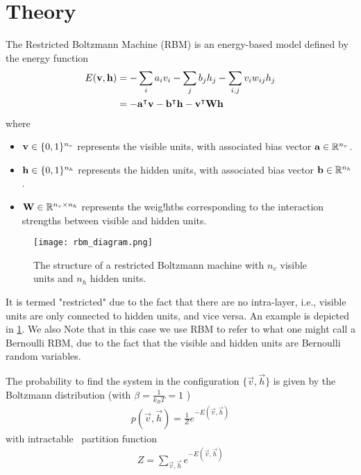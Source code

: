 \section{Theory}
The Restricted Boltzmann Machine (RBM) is an energy-based model defined by the energy function~\cite{goodfellow_deep_learning}
\begin{align}
    E(\mathbf{v}, \mathbf{h})
        &= -\sum_i a_i v_i - \sum_j b_j h_j - \sum_{i,j} v_i w_{ij} h_j \label{eq:rbm_energy} \\
        &= -\mathbf{a}^\intercal\mathbf{v} - \mathbf{b}^\intercal\mathbf{h} - \mathbf{v}^\intercal\mathbf{W}\mathbf{h} \label{eq:rbm_energy_vectorized}
\end{align}
where
\begin{itemize}
    \item \( \mathbf{v} \in \{0,1\}^{n_v} \) represents the visible units, with associated bias vector \( \mathbf{a} \in \mathbb{R}^{n_v} \).
    \item \( \mathbf{h} \in \{0,1\}^{n_h} \) represents the hidden units, with associated bias vector \( \mathbf{b} \in \mathbb{R}^{n_h} \).
    \item \( \mathbf{W} \in \mathbb{R}^{n_v \times n_h} \) represents the weig!htbs corresponding to the interaction strengths between visible and hidden units.
\end{itemize}

\begin{figure}[!htb]
    \begin{center}
        \texttt{[image: rbm\_diagram.png]}
    \end{center}
    \caption{The structure of a restricted Boltzmann machine with \( n_v \) visible units and \( n_h \) hidden units.}
    \label{fig:rbm_diagram}
\end{figure}

It is termed "restricted" due to the fact that there are no intra-layer, i.e., visible units are only connected to hidden units, and vice versa.
An example is depicted in \cref{fig:rbm_diagram}.
We also Note that in this case we use RBM to refer to what one might call a Bernoulli RBM, due to the fact that the visible and hidden units are Bernoulli random variables.

The probability to find the system in the configuration \( \{\vec{v},\vec{h}\} \) is given by the Boltzmann distribution (with \( \beta = \frac{1}{k_BT} = 1 \) )
\begin{align}
    p(\vec{v}, \vec{h}) = \frac{1}{Z} e^{-E(\vec{v},\vec{h})}
\end{align}
with intractable~\cite{long_servedio_2010} partition function
\begin{align}
    Z = \sum_{\vec{v},\vec{h}} e^{-E(\vec{v},\vec{h})}
\end{align}

